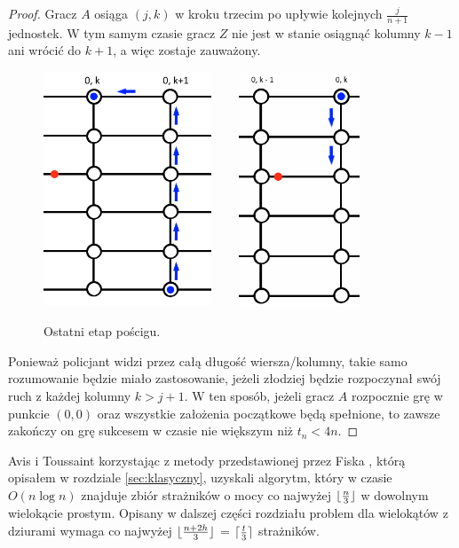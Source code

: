 \documentclass{xmgr}
\DeclarePairedDelimiter\ceil{\lceil}{\rceil}
\DeclarePairedDelimiter\floor{\lfloor}{\rfloor}
\theoremstyle{definition}
\begin{document}
\begin{proof}
	\indent Gracz $A$ osiąga $(j,k)$ w kroku trzecim po upływie kolejnych $\frac{j}{n+1}$ jednostek. W tym samym czasie gracz $Z$ nie jest w stanie osiągnąć kolumny $k-1$ ani wrócić do $k + 1$, a więc zostaje zauważony.
	\begin{figure}[ht!]
	  \centering
	  \includegraphics[width=5cm,height=7cm]{rysunki/poscig_4.png}
	  \includegraphics[width=5cm,height=7cm]{rysunki/poscig_5.png}
	  \caption{Ostatni etap pościgu.}
	  \label{fig:ostatni etap poscigu}
    \vspace{5in}
	\end{figure} 

	\indent Ponieważ policjant widzi przez całą długość wiersza/kolumny, takie samo rozumowanie będzie miało zastosowanie, jeżeli złodziej będzie rozpoczynał swój ruch z każdej kolumny $k > j + 1$. W ten sposób, jeżeli gracz $A$ rozpocznie grę w punkcie $(0,0)$ oraz wszystkie założenia początkowe będą spełnione, to zawsze zakończy on grę sukcesem w czasie nie większym niż $t_n < 4n$.
\end{proof} 

\summary
Avis i Toussaint \cite{avis} korzystając z metody przedstawionej przez Fiska \cite{fisk}, którą opisałem w rozdziale \ref{sec:klasyczny}, uzyskali algorytm, który w czasie $O(n \log n)$ znajduje zbiór strażników o mocy co najwyżej $\floor{\frac{n}{3}}$ w dowolnym wielokącie prostym. Opisany w dalszej części rozdziału problem dla wielokątów z dziurami wymaga co najwyżej $\floor{\frac{n+2h}{3}}$ = $\ceil{\frac{t}{3}}$ strażników.
\end{document}
